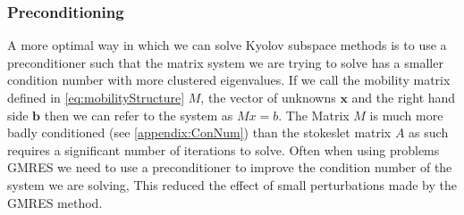 \subsubsection{Preconditioning} \label{sec:Preconditioning}
A more optimal way in which we can solve Kyolov subspace methods is to use a preconditioner such that the matrix system we are trying to solve has a smaller condition number with more clustered eigenvalues. If we call the mobility matrix defined in \cref{eq:mobilityStructure} $M$, the vector of unknowns $\bm{x}$ and the right hand side $\bm{b}$ then we can refer to the system as $Mx=b$. The Matrix $M$ is much more badly conditioned (see \cref{appendix:ConNum}) than the stokeslet matrix $A$ as such requires a significant number of iterations to solve. Often when using problems GMRES we need to use a preconditioner to improve the condition number of the system we are solving, This reduced the effect of small perturbations made by the GMRES method.


